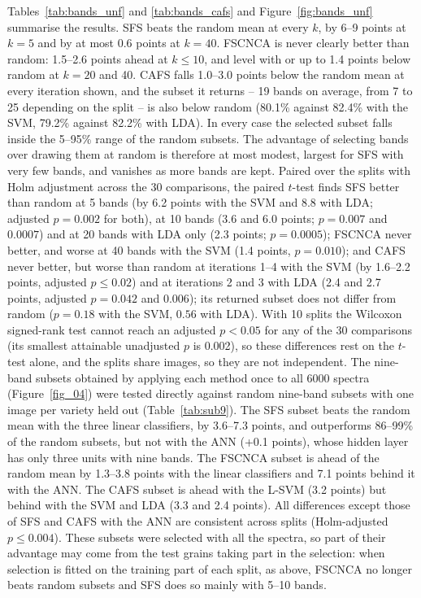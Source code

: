\documentclass[final,5p,times,twocolumn]{elsarticle}
\newcommand{\added}[1]{{\color{blue}#1}}
\begin{document}
\added{Tables~\ref{tab:bands_unf} and \ref{tab:bands_cafs} and Figure~\ref{fig:bands_unf} summarise the results. SFS beats the random mean at every $k$, by 6--9 points at $k=5$ and by at most 0.6 points at $k=40$. FSCNCA is never clearly better than random: 1.5--2.6 points ahead at $k\le10$, and level with or up to 1.4 points below random at $k=20$ and 40. CAFS falls 1.0--3.0 points below the random mean at every iteration shown, and the subset it returns -- 19 bands on average, from 7 to 25 depending on the split -- is also below random (80.1\% against 82.4\% with the SVM, 79.2\% against 82.2\% with LDA). In every case the selected subset falls inside the 5--95\% range of the random subsets. The advantage of selecting bands over drawing them at random is therefore at most modest, largest for SFS with very few bands, and vanishes as more bands are kept. Paired over the splits with Holm adjustment across the 30 comparisons, the paired $t$-test finds SFS better than random at 5 bands (by 6.2 points with the SVM and 8.8 with LDA; adjusted $p=0.002$ for both), at 10 bands (3.6 and 6.0 points; $p=0.007$ and $0.0007$) and at 20 bands with LDA only (2.3 points; $p=0.0005$); FSCNCA never better, and worse at 40 bands with the SVM (1.4 points, $p=0.010$); and CAFS never better, but worse than random at iterations 1--4 with the SVM (by 1.6--2.2 points, adjusted $p\le0.02$) and at iterations 2 and 3 with LDA (2.4 and 2.7 points, adjusted $p=0.042$ and $0.006$); its returned subset does not differ from random ($p=0.18$ with the SVM, $0.56$ with LDA). With 10 splits the Wilcoxon signed-rank test cannot reach an adjusted $p<0.05$ for any of the 30 comparisons (its smallest attainable unadjusted $p$ is 0.002), so these differences rest on the $t$-test alone, and the splits share images, so they are not independent.}
\added{The nine-band subsets obtained by applying each method once to all 6000 spectra (Figure~\ref{fig_04}) were tested directly against random nine-band subsets with one image per variety held out (Table~\ref{tab:sub9}). The SFS subset beats the random mean with the three linear classifiers, by 3.6--7.3 points, and outperforms 86--99\% of the random subsets, but not with the ANN (+0.1 points), whose hidden layer has only three units with nine bands. The FSCNCA subset is ahead of the random mean by 1.3--3.8 points with the linear classifiers and 7.1 points behind it with the ANN. The CAFS subset is ahead with the L-SVM (3.2 points) but behind with the SVM and LDA (3.3 and 2.4 points). All differences except those of SFS and CAFS with the ANN are consistent across splits (Holm-adjusted $p\le0.004$). These subsets were selected with all the spectra, so part of their advantage may come from the test grains taking part in the selection: when selection is fitted on the training part of each split, as above, FSCNCA no longer beats random subsets and SFS does so mainly with 5--10 bands.}
\end{document}
